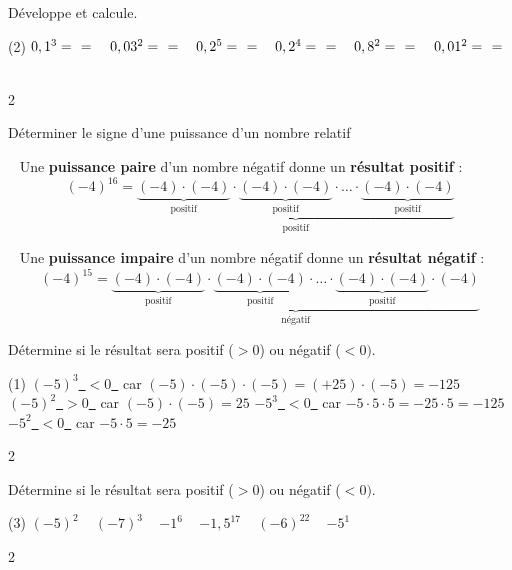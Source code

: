 \documentclass[a4paper,11pt]{report}
\begin{document}
\begin{exop}{
Développe et calcule. %
\begin{tasks}(2)
    \task $0,1^3=~\hrulefill~=$ ~
    \task $0,03^2=~\hrulefill~=$ ~
    \task $0,2^5=~\hrulefill~=$ ~
    \task $0,2^4=~\hrulefill~=$ ~
    \task $0,8^2=~\hrulefill~=$ ~
    \task $0,01^2=~\hrulefill~=$ ~
\end{tasks}
}{2}
\end{exop}

\begin{resolu}{Déterminer le signe d'une puissance d'un nombre relatif}{

\faExclamationTriangle~ Une \textbf{puissance paire} d'un nombre négatif donne un \textbf{résultat positif} : \[ (-4)^{16}=\underbrace{\underbrace{(-4)\cdot(-4)}_{\textrm{positif}}\cdot\underbrace{(-4)\cdot(-4)}_{\textrm{positif}}\cdot\ldots\cdot\underbrace{(-4)\cdot(-4)}_{\textrm{positif}}}_{\textrm{positif}} \]

\faExclamationTriangle~ Une \textbf{puissance impaire} d'un nombre négatif donne un \textbf{résultat négatif} : \[ (-4)^{15}=\underbrace{\underbrace{(-4)\cdot(-4)}_{\textrm{positif}}\cdot\underbrace{(-4)\cdot(-4)}_{\textrm{positif}}\cdot\ldots\cdot\underbrace{(-4)\cdot(-4)}_{\textrm{positif}}\cdot(-4)}_{\textrm{négatif}} \]

\bigskip

Détermine si le résultat sera positif ($>0$) ou négatif ($<0)$.

\begin{tasks}(1)
    \task $(-5)^3$\underline{~$<0$~} car $(-5)\cdot(-5)\cdot(-5)=(+25)\cdot(-5)=-125$
    \task $(-5)^2$\underline{~$>0$~} car $(-5)\cdot(-5)=25$
    \task $-5^3$\underline{~$<0$~} car $-5\cdot5\cdot5=-25\cdot5=-125$
    \task $-5^2$\underline{~$<0$~} car $-5\cdot5=-25$

\end{tasks}

}{2}
\end{resolu}

\begin{exop}{
Détermine si le résultat sera positif ($>0$) ou négatif ($<0)$.

\begin{tasks}(3)
    \task $(-5)^2$ \hrulefill~
    \task $(-7)^3$ \hrulefill~
    \task $-1^6$ \hrulefill~
    \task $-1,5^{17}$ \hrulefill~
    \task $(-6)^{22}$ \hrulefill~
    \task $-5^1$ \hrulefill~
\end{tasks}
 }{2}
\end{exop}
\end{document}

